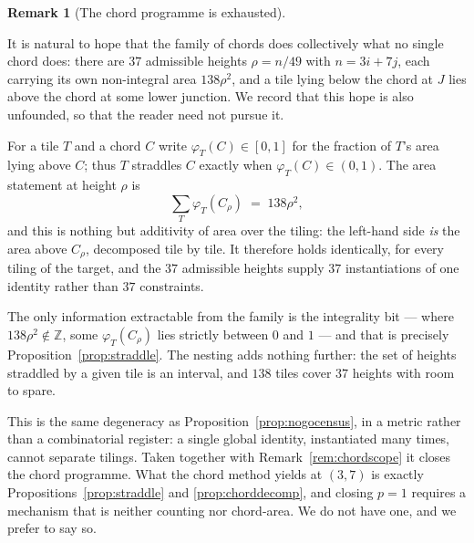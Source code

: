 \documentclass[11pt,reqno]{amsart}
\theoremstyle{plain}
\theoremstyle{definition}
\newtheorem{remark}[theorem]{Remark}
\begin{document}
\begin{remark}[The chord programme is exhausted]\label{O-chordexhausted}

It is natural to hope that the family of chords does collectively what no single chord does: there
are $37$ admissible heights $\rho=n/49$ with $n=3i+7j$, each carrying its own non-integral area
$138\rho^{2}$, and a tile lying below the chord at $J$ lies above the chord at some lower junction. We
record that this hope is also unfounded, so that the reader need not pursue it.

For a tile $T$ and a chord $C$ write $\varphi_T(C)\in[0,1]$ for the fraction of $T$'s area lying above
$C$; thus $T$ straddles $C$ exactly when $\varphi_T(C)\in(0,1)$. The area statement at height $\rho$ is
\[
\sum_{T}\varphi_T(C_\rho)\;=\;138\rho^{2},
\]
and this is nothing but additivity of area over the tiling: the left-hand side \emph{is} the area
above $C_\rho$, decomposed tile by tile. It therefore holds identically, for every tiling of the
target, and the $37$ admissible heights supply $37$ instantiations of one identity rather than $37$
constraints.

The only information extractable from the family is the integrality bit --- where $138\rho^{2}\notin
\mathbb Z$, some $\varphi_T(C_\rho)$ lies strictly between $0$ and $1$ --- and that is precisely
Proposition~\ref{prop:straddle}. The nesting adds nothing further: the set of heights straddled by a
given tile is an interval, and $138$ tiles cover $37$ heights with room to spare.

This is the same degeneracy as Proposition~\ref{prop:nogocensus}, in a metric rather than a
combinatorial register: a single global identity, instantiated many times, cannot separate tilings.
Taken together with Remark~\ref{rem:chordscope} it closes the chord programme. What the chord method
yields at $(3,7)$ is exactly Propositions~\ref{prop:straddle} and \ref{prop:chorddecomp}, and closing
$p=1$ requires a mechanism that is neither counting nor chord-area. We do not have one, and we prefer
to say so.
\end{remark}
\end{document}
